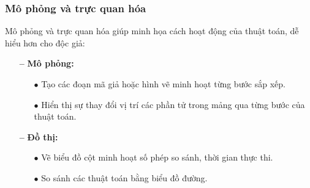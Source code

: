 \subsubsection{Mô phỏng và trực quan hóa}
Mô phỏng và trực quan hóa giúp minh họa cách hoạt động của thuật toán, dễ hiểu hơn cho độc giả:

\begin{itemize}
    \item [\textbf{--}]\textbf{Mô phỏng:}
    \begin{itemize}
        \item [$\bullet$]Tạo các đoạn mã giả hoặc hình vẽ minh hoạt từng bước sắp xếp.
        \item [$\bullet$]Hiển thị sự thay đổi vị trí các phần tử trong mảng qua từng bước của thuật toán.
    \end{itemize}
    \item [\textbf{--}]\textbf{Đồ thị:}
    \begin{itemize}
        \item [$\bullet$]Vẽ biểu đồ cột minh hoạt số phép so sánh, thời gian thực thi.
        \item [$\bullet$]So sánh các thuật toán bằng biểu đồ đường.
    \end{itemize}
\end{itemize}
\newpage
